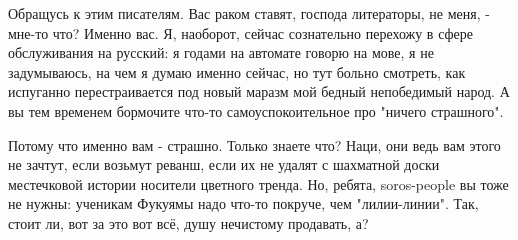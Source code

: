 Обращусь к этим писателям. Вас раком ставят, господа литераторы, не меня, -
мне-то что? Именно вас. Я, наоборот, сейчас сознательно перехожу в сфере
обслуживания на русский: я годами на автомате говорю на мове, я не задумываюсь,
на чем я думаю именно сейчас, но тут больно смотреть, как испуганно
перестраивается под новый маразм мой бедный непобедимый народ. А вы тем
временем бормочите что-то самоуспокоительное про "ничего страшного". 

Потому что именно вам - страшно. Только знаете что? Наци, они ведь вам этого не
зачтут, если возьмут реванш, если их не удалят с шахматной доски местечковой
истории носители цветного тренда. Но, ребята, soros-people вы тоже не нужны:
ученикам Фукуямы надо что-то покруче, чем "лилии-линии". Так, стоит ли, вот за
это вот всё, душу нечистому продавать, а?

